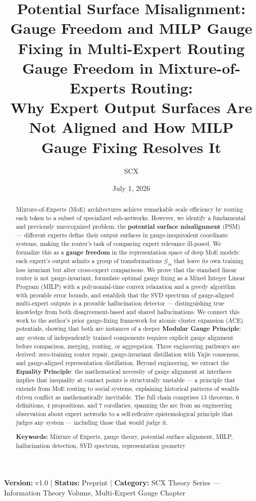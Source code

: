 \documentclass[12pt,a4paper]{article}
\title{\textbf{Potential Surface Misalignment: Gauge Freedom and MILP Gauge Fixing in Multi-Expert Routing}\\[4pt]
\large Gauge Freedom in Mixture-of-Experts Routing: \\[2pt]
Why Expert Output Surfaces Are Not Aligned and How MILP Gauge Fixing Resolves It}
\author{SCX}
\date{July 1, 2026}
\theoremstyle{remark}
\newcommand{\G}{\mathcal{G}}
\begin{document}
\maketitle

\begin{center}
\footnotesize
\textbf{Version: } v1.0 \quad | \quad
\textbf{Status: } Preprint \quad | \quad
\textbf{Category: } SCX Theory Series — Information Theory Volume, Multi-Expert Gauge Chapter
\end{center}

\begin{abstract}

Mixture-of-Experts (MoE) architectures achieve remarkable scale efficiency by routing each token to a subset of specialized sub-networks. However, we identify a fundamental and previously unrecognized problem: the \textbf{potential surface misalignment} (PSM) — different experts define their output surfaces in gauge-inequivalent coordinate systems, making the router's task of comparing expert relevance ill-posed. We formalize this as a \textbf{gauge freedom} in the representation space of deep MoE models: each expert's output admits a group of transformations $\G_m$ that leave its own training loss invariant but alter cross-expert comparisons. We prove that the standard linear router is not gauge-invariant, formulate optimal gauge fixing as a Mixed Integer Linear Program (MILP) with a polynomial-time convex relaxation and a greedy algorithm with provable error bounds, and establish that the SVD spectrum of gauge-aligned multi-expert outputs is a provable hallucination detector — distinguishing true knowledge from both disagreement-based and shared hallucinations. We connect this work to the author's prior gauge-fixing framework for atomic cluster expansion (ACE) potentials, showing that both are instances of a deeper \textbf{Modular Gauge Principle}: any system of independently trained components requires explicit gauge alignment before comparison, merging, routing, or aggregation. Three engineering pathways are derived: zero-training router repair, gauge-invariant distillation with Yajie consensus, and gauge-aligned representation distillation. Beyond engineering, we extract the \textbf{Equality Principle}: the mathematical necessity of gauge alignment at interfaces implies that inequality at contact points is structurally unstable — a principle that extends from MoE routing to social systems, explaining historical patterns of wealth-driven conflict as mathematically inevitable. The full chain comprises 13 theorems, 6 definitions, 4 propositions, and 7 corollaries, spanning the arc from an engineering observation about expert networks to a self-reflexive epistemological principle that judges any system — including those that would judge it.

\vspace{4pt}
\noindent\textbf{Keywords:} Mixture of Experts, gauge theory, potential surface alignment, MILP, hallucination detection, SVD spectrum, representation geometry

\end{abstract}
\end{document}
